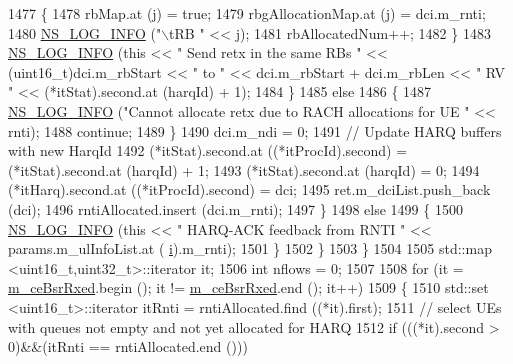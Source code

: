 \begin{DoxyCode}
1477                     \{
1478                       rbMap.at (j) = \textcolor{keyword}{true};
1479                       rbgAllocationMap.at (j) = dci.m\_rnti;
1480                       \hyperlink{group__logging_gafbd73ee2cf9f26b319f49086d8e860fb}{NS\_LOG\_INFO} (\textcolor{stringliteral}{"\(\backslash\)tRB "} << j);
1481                       rbAllocatedNum++;
1482                     \}
1483                   \hyperlink{group__logging_gafbd73ee2cf9f26b319f49086d8e860fb}{NS\_LOG\_INFO} (\textcolor{keyword}{this} << \textcolor{stringliteral}{" Send retx in the same RBs "} << (uint16\_t)dci.m\_rbStart 
      << \textcolor{stringliteral}{" to "} << dci.m\_rbStart + dci.m\_rbLen << \textcolor{stringliteral}{" RV "} << (*itStat).second.at (harqId) + 1);
1484                 \}
1485               \textcolor{keywordflow}{else}
1486                 \{
1487                   \hyperlink{group__logging_gafbd73ee2cf9f26b319f49086d8e860fb}{NS\_LOG\_INFO} (\textcolor{stringliteral}{"Cannot allocate retx due to RACH allocations for UE "} << rnti);
1488                   \textcolor{keywordflow}{continue};
1489                 \}
1490               dci.m\_ndi = 0;
1491               \textcolor{comment}{// Update HARQ buffers with new HarqId}
1492               (*itStat).second.at ((*itProcId).second) = (*itStat).second.at (harqId) + 1;
1493               (*itStat).second.at (harqId) = 0;
1494               (*itHarq).second.at ((*itProcId).second) = dci;
1495               ret.m\_dciList.push\_back (dci);
1496               rntiAllocated.insert (dci.m\_rnti);
1497             \}
1498             \textcolor{keywordflow}{else}
1499             \{
1500               \hyperlink{group__logging_gafbd73ee2cf9f26b319f49086d8e860fb}{NS\_LOG\_INFO} (\textcolor{keyword}{this} << \textcolor{stringliteral}{" HARQ-ACK feedback from RNTI "} << params.m\_ulInfoList.at (
      \hyperlink{bernuolliDistribution_8m_a6f6ccfcf58b31cb6412107d9d5281426}{i}).m\_rnti);
1501             \}
1502         \}
1503     \}
1504 
1505   std::map <uint16\_t,uint32\_t>::iterator it;
1506   \textcolor{keywordtype}{int} nflows = 0;
1507 
1508   \textcolor{keywordflow}{for} (it = \hyperlink{classns3_1_1FdMtFfMacScheduler_a10a21cad9af4c783734123f38e697316}{m\_ceBsrRxed}.begin (); it != \hyperlink{classns3_1_1FdMtFfMacScheduler_a10a21cad9af4c783734123f38e697316}{m\_ceBsrRxed}.end (); it++)
1509     \{
1510       std::set <uint16\_t>::iterator itRnti = rntiAllocated.find ((*it).first);
1511       \textcolor{comment}{// select UEs with queues not empty and not yet allocated for HARQ}
1512       \textcolor{keywordflow}{if} (((*it).second > 0)&&(itRnti == rntiAllocated.end ()))

\end{DoxyCode}
